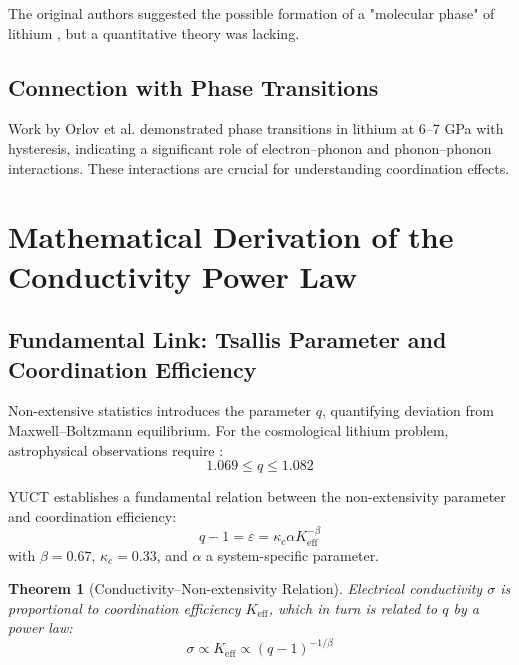 \documentclass[12pt,a4paper]{article}
\newtheorem{theorem}{Theorem}[section]
\theoremstyle{remark}
\newcommand{\Ke}{K_{\mathrm{eff}}}
\newcommand{\kappac}{\kappa_c}
\newcommand{\alp}{\alpha}
\begin{document}
	The original authors suggested the possible formation of a "molecular phase" of lithium \cite{fortov1999}, but a quantitative theory was lacking.
	
	\subsection{Connection with Phase Transitions}
	
	Work by Orlov et al. \cite{orlov2001} demonstrated phase transitions in lithium at 6–7 GPa with hysteresis, indicating a significant role of electron–phonon and phonon–phonon interactions. These interactions are crucial for understanding coordination effects.
	
	\section{Mathematical Derivation of the Conductivity Power Law}
	
	\subsection{Fundamental Link: Tsallis Parameter and Coordination Efficiency}
	
	Non-extensive statistics \cite{tsallis1988} introduces the parameter \(q\), quantifying deviation from Maxwell–Boltzmann equilibrium. For the cosmological lithium problem, astrophysical observations require \cite{bertulani2015}:
	\begin{equation}
		1.069 \le q \le 1.082
		\label{eq:q_range}
	\end{equation}
	
	YUCT establishes a fundamental relation between the non-extensivity parameter and coordination efficiency:
	\begin{equation}
		q - 1 = \varepsilon = \kappac \alp \Ke^{-\beta}
		\label{eq:q_keff}
	\end{equation}
	with \(\beta = 0.67\), \(\kappac = 0.33\), and \(\alp\) a system-specific parameter.
	
	\begin{theorem}[Conductivity–Non-extensivity Relation]
		Electrical conductivity \(\sigma\) is proportional to coordination efficiency \(\Ke\), which in turn is related to \(q\) by a power law:
		\begin{equation}
			\sigma \propto \Ke \propto (q-1)^{-1/\beta}
			\label{eq:sigma_q}
		\end{equation}
		\label{th:conductivity}
	\end{theorem}
	
\end{document}
